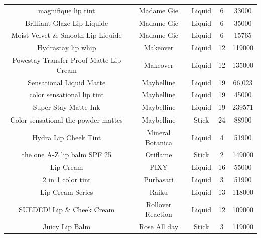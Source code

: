 \documentclass{article}
\begin{document}
\begin{longtable}{ccccc}
    magnifique lip tint                     & Madame Gie        & Liquid                       & 6               & 33000          \\
    Brilliant Glaze Lip Liquide             & Madame Gie        & Liquid                       & 6               & 35000          \\
    Moist Velvet \& Smooth Lip Liquide      & Madame Gie        & Liquid                       & 6               & 15765          \\
    Hydrastay lip whip                      & Makeover          & Liquid                       & 12              & 119000         \\
    Powestay Transfer Proof Matte Lip Cream & Makeover          & Liquid                       & 12              & 135000         \\
    Sensational Liquid Matte                & Maybelline        & Liquid                       & 19              & 66,023         \\
    color sensational lip tint              & Maybelline        & Liquid                       & 19              & 45000          \\
    Super Stay Matte Ink                    & Maybelline        & Liquid                       & 19              & 239571         \\
    Color sensational the powder mattes     & Maybelline        & Stick                        & 24              & 88900          \\
    Hydra Lip Cheek Tint                    & Mineral Botanica  & Liquid                       & 4               & 51900          \\
    the one A-Z lip balm SPF 25             & Oriflame          & Stick                        & 2               & 149000         \\
    Lip Cream                               & PIXY              & Liquid                       & 16              & 55000          \\
    2 in 1 color tint                       & Purbasari         & Liquid                       & 3               & 51900          \\
    Lip Cream Series                        & Raiku             & Liquid                       & 13              & 118000         \\
    SUEDED! Lip \& Cheek Cream              & Rollover Reaction & Liquid                       & 12              & 109000         \\
    Juicy Lip Balm                          & Rose All day      & Stick                        & 3               & 119000         \\

\end{longtable}
\end{document}
